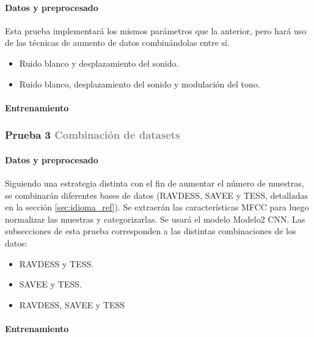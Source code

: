 \documentclass[11pt,a4paper,spanish]{book}
\begin{document}
	\hfill\begin{minipage}{\dimexpr\textwidth-1cm}
		\paragraph{Datos y preprocesado}Esta prueba implementará los mismos parámetros que la anterior, pero hará uso de las técnicas de aumento de datos combinándolas entre sí.
		\begin{itemize}
			\item Ruido blanco y desplazamiento del sonido.
			\item Ruido blanco, desplazamiento del sonido y modulación del tono.
		\end{itemize}
		\paragraph{Entrenamiento}
	\end{minipage}

	\subsubsection[]{\Large Prueba 3 {\normalsize \textcolor{Gray}{Combinación de datasets}}}
	\hfill\begin{minipage}{\dimexpr\textwidth-1cm}
		
		\paragraph{Datos y preprocesado} Siguiendo una estrategia distinta con el fin de aumentar el número de muestras, se combinarán diferentes bases de datos (RAVDESS, SAVEE y TESS, detalladas en la sección \ref{sec:idioma_ref}). Se extraerán las características MFCC para luego normalizar las muestras y categorizarlas.
		Se usará el modelo Modelo2 CNN. Las subsecciones de esta prueba corresponden a las distintas combinaciones de los datos:
		\begin{itemize}
			\item RAVDESS y TESS.
			\item SAVEE y TESS.
			\item RAVDESS, SAVEE y TESS
		\end{itemize}
	
		\paragraph{Entrenamiento}
	\end{minipage}
\end{document}

